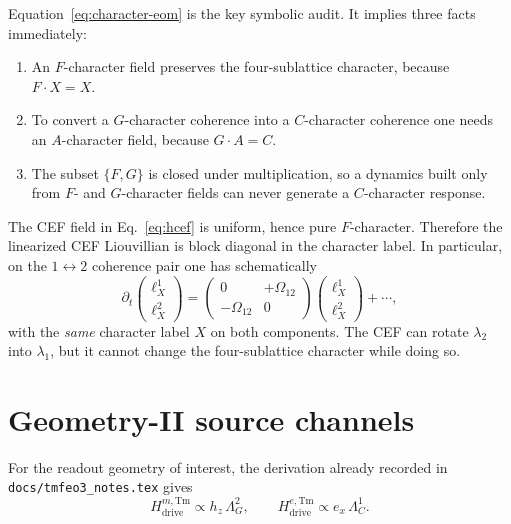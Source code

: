 \documentclass[11pt]{article}
\begin{document}
Equation~\eqref{eq:character-eom} is the key symbolic audit. It implies three
facts immediately:
\begin{enumerate}[leftmargin=*]
\item An $F$-character field preserves the four-sublattice character, because
      $F\cdot X = X$.
\item To convert a $G$-character coherence into a $C$-character coherence one
      needs an $A$-character field, because $G\cdot A = C$.
\item The subset $\{F,G\}$ is closed under multiplication, so a dynamics built
      only from $F$- and $G$-character fields can never generate a
      $C$-character response.
\end{enumerate}

The CEF field in Eq.~\eqref{eq:hcef} is uniform, hence pure $F$-character.
Therefore the linearized CEF Liouvillian is block diagonal in the character
label. In particular, on the $1 \leftrightarrow 2$ coherence pair one has
schematically
\begin{equation}
\partial_t
\begin{pmatrix}
\ell_X^1 \\
\ell_X^2
\end{pmatrix}
=
\begin{pmatrix}
0 & +\Omega_{12} \\
-\Omega_{12} & 0
\end{pmatrix}
\begin{pmatrix}
\ell_X^1 \\
\ell_X^2
\end{pmatrix}
+ \cdots,
\label{eq:12-rotation}
\end{equation}
with the \emph{same} character label $X$ on both components. The CEF can rotate
$\lambda_2$ into $\lambda_1$, but it cannot change the four-sublattice
character while doing so.

\section{Geometry-II source channels}

For the readout geometry of interest, the derivation already recorded in
\texttt{docs/tmfeo3\_notes.tex} gives
\begin{equation}
H_{\mathrm{drive}}^{m,\mathrm{Tm}} \propto h_z \, \Lambda_G^2,
\qquad
H_{\mathrm{drive}}^{e,\mathrm{Tm}} \propto e_x \, \Lambda_C^1.
\label{eq:geometry-two-source}
\end{equation}
\end{document}
